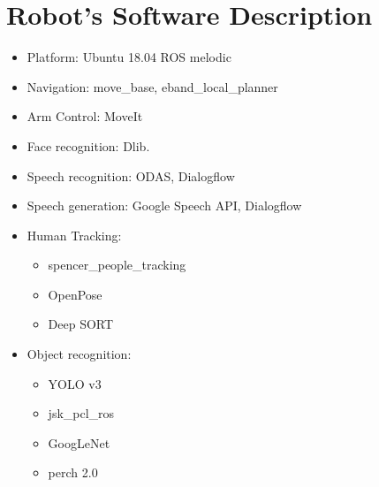 \section*{Robot's Software Description}

\begin{itemize}
    \item Platform: Ubuntu 18.04 ROS melodic
    \item Navigation: move\_base, eband\_local\_planner
    \item Arm Control: MoveIt
    \item Face recognition: Dlib.
    \item Speech recognition: ODAS, Dialogflow
    \item Speech generation: Google Speech API, Dialogflow
    \item Human Tracking:
          \begin{itemize}
              \item spencer\_people\_tracking
              \item OpenPose
              \item Deep SORT
          \end{itemize}
    \item Object recognition:
          \begin{itemize}
              \item YOLO v3
              \item jsk\_pcl\_ros
              \item GoogLeNet
              \item perch 2.0
          \end{itemize}
\end{itemize}
